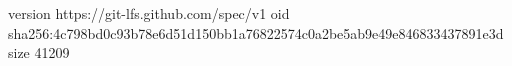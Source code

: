 version https://git-lfs.github.com/spec/v1
oid sha256:4c798bd0c93b78e6d51d150bb1a76822574c0a2be5ab9e49e846833437891e3d
size 41209
